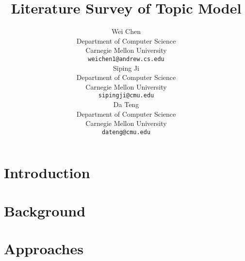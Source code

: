 \documentclass{article} %
\title{Literature Survey of Topic Model}
\author{
Wei Chen \\
Department of Computer Science\\
Carnegie Mellon University\\
\texttt{weichen1@andrew.cs.edu} \\
\And
Siping Ji\\
Department of Computer Science\\
Carnegie Mellon University\\
\texttt{sipingji@cmu.edu} \\
\AND
Da Teng \\
Department of Computer Science\\
Carnegie Mellon University\\
\texttt{dateng@cmu.edu} \\
}
\begin{document}
\maketitle

\tableofcontents

\newpage
\section{Introduction}
    \label{sec:intro}
    
    
\section{Background}
    \label{sec:background}
    
    
\section{Approaches}
    \label{sec:approach}
    

%
%
%



\end{document}
